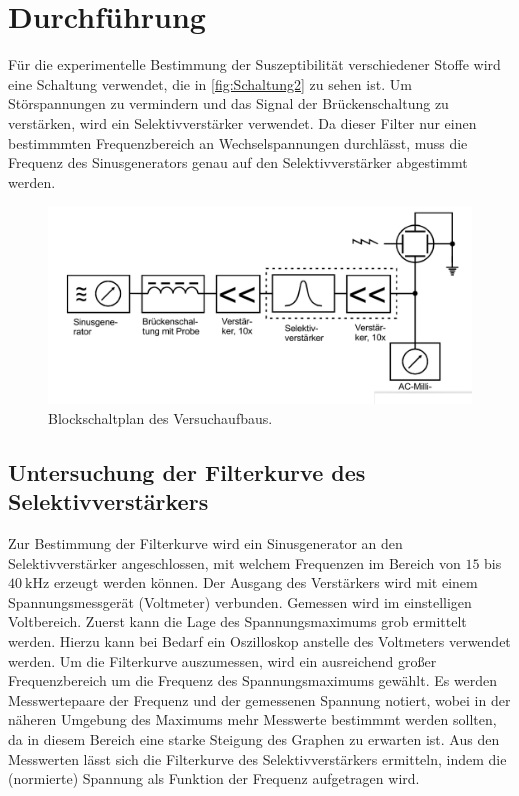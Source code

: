 \section{Durchführung}
\label{sec:Durchführung}
Für die experimentelle Bestimmung der Suszeptibilität verschiedener Stoffe wird eine Schaltung verwendet, die in \autoref{fig:Schaltung2} zu sehen ist.
Um Störspannungen zu vermindern und das Signal der Brückenschaltung zu verstärken, wird ein Selektivverstärker verwendet. Da dieser Filter nur einen 
bestimmmten Frequenzbereich an Wechselspannungen durchlässt, muss die Frequenz des Sinusgenerators genau auf den Selektivverstärker abgestimmt werden.

\begin{figure}
    \centering
    \includegraphics[width = .8\textwidth]{content/Schaltung2.png}
    \caption{Blockschaltplan des Versuchaufbaus. \cite{v606}}
    \label{fig:Schaltung2}
\end{figure}

\subsection{Untersuchung der Filterkurve des Selektivverstärkers}
\label{subsec:D_Filterkurve}
Zur Bestimmung der Filterkurve wird ein Sinusgenerator an den Selektivverstärker angeschlossen, mit welchem Frequenzen im Bereich von $15$ bis $\qty{40}{\kilo\hertz}$
erzeugt werden können. Der Ausgang des Verstärkers wird mit einem Spannungsmessgerät (Voltmeter) verbunden. Gemessen wird im einstelligen Voltbereich.
Zuerst kann die Lage des Spannungsmaximums grob ermittelt werden. Hierzu kann bei Bedarf ein Oszilloskop anstelle des Voltmeters verwendet werden.
Um die Filterkurve auszumessen, wird ein ausreichend großer Frequenzbereich um die Frequenz des Spannungsmaximums gewählt. Es werden Messwertepaare der Frequenz
und der gemessenen Spannung notiert, wobei in der näheren Umgebung des Maximums mehr Messwerte bestimmmt werden sollten, da in diesem Bereich eine starke Steigung 
des Graphen zu erwarten ist.
Aus den Messwerten lässt sich die Filterkurve des Selektivverstärkers ermitteln, indem die (normierte) Spannung als Funktion der Frequenz aufgetragen wird.

